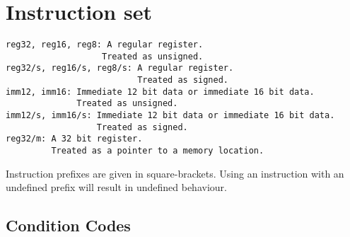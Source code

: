 \section{Instruction set}


\begin{verbatim}
reg32, reg16, reg8: A regular register. 
                   Treated as unsigned.
reg32/s, reg16/s, reg8/s: A regular register. 
                          Treated as signed.
imm12, imm16: Immediate 12 bit data or immediate 16 bit data.
              Treated as unsigned.
imm12/s, imm16/s: Immediate 12 bit data or immediate 16 bit data. 
                  Treated as signed.
reg32/m: A 32 bit register. 
         Treated as a pointer to a memory location.
\end{verbatim}

Instruction prefixes are given in square-brackets. Using an instruction with an undefined prefix will result in undefined behaviour.

\subsection{Condition Codes}

